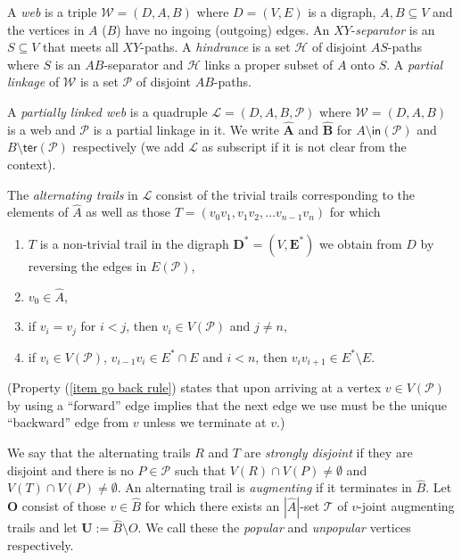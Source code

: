 \documentclass[12pt,a4paper]{amsart}
\theoremstyle{plain}
\theoremstyle{definition}
\begin{document}
 A \emph{web} is a triple $\boldsymbol{ \mathcal{W}}=(D,A,B) $ where $ D=(V,E) $ is a digraph,  $ A,B\subseteq V $ 
 and the vertices in $ A $ ($ B $) have no ingoing (outgoing) edges. 
 An $ XY $-\emph{separator}  is an $ S\subseteq V $ that meets all $ XY $-paths. A \emph{hindrance}  is a set $ 
  \mathcal{H} $ of disjoint $ AS $-paths where $ S 
 $ is an $ AB $-separator and $ \mathcal{H} $ links a proper 
 subset of $ A $ onto $ S $.
 A 
 \emph{partial linkage} of $ \mathcal{W} $ is a set $ \mathcal{P} $ of disjoint  $ AB $-paths. 
 
 A \emph{partially linked 
 web} is a 
 quadruple $ 
 \boldsymbol{\mathcal{L}}=(D,A,B, \mathcal{P}) $ where $\mathcal{W}= (D,A,B) $ is a web and $ \mathcal{P} $ is a 
 partial linkage in it. We write $ 
\boldsymbol{ \widehat{A}} $ and $ \boldsymbol{\widehat{B}} $ for $ A \setminus \mathsf{in}(\mathcal{P}) $ and $ B 
\setminus 
 \mathsf{ter}(\mathcal{P}) $ respectively (we add $ \mathcal{L} $ as subscript if it is not clear from the context).   
 
 The \emph{alternating trails} in $ \mathcal{L} $ consist of the trivial trails corresponding to the elements of $ \widehat{A} 
 $ as well as those
 $T= (v_0v_1, 
 v_1v_2, \dots v_{n-1}v_n) $ for which
 
 
 \begin{enumerate}
 \item\label{item: reversed edges} $ T $ is a non-trivial trail in the digraph $ \boldsymbol{D^{*}}=(V,\boldsymbol{E^{*}}) 
 $ we 
  obtain from $ D $ by reversing 
  the edges in $ E(\mathcal{P})$, 
 \item\label{item: start in A hat}  $ v_0\in \widehat{A} $,
 \item\label{item: repeat vertex} if $ v_i=v_j $ for $ i< j $, then $ v_i\in V(\mathcal{P}) $ and $ j\neq n $,
 \item\label{item go back rule} if $ v_{i}\in V(\mathcal{P}) $,   $v_{i-1}v_{i}\in E^{*}\cap E $ and  $ i<n $, then 
 $ 
 v_{i}v_{i+1}\in E^{*}\setminus E $. 
 \end{enumerate}
(Property (\ref{item go back rule}) states that upon arriving at a vertex $ v\in V(\mathcal{P}) $ by using a ``forward'' edge implies that the 
next edge we use must be the unique ``backward'' edge from $ v $ unless we terminate at $ v $.)
 
We say that the alternating trails $ R $ and $ T $ are \emph{strongly disjoint} if they are disjoint and there is no $ P\in 
\mathcal{P} $ 
such that $ V(R)\cap V(P)\neq \emptyset  $ and $ V(T)\cap V(P)\neq \emptyset  $.  An alternating trail is \emph{augmenting} 
if it terminates in $ \widehat{B} $.    Let $ 
\boldsymbol{O} $ consist 
 of those $ v\in \widehat{B} $ for which there exists an $ 
\left|\widehat{A}\right|$-set  $ \mathcal{T} $ of $ v $-joint augmenting trails and let 
$\boldsymbol{U}:=\widehat{B}\setminus 
O $. We call these the \emph{popular} and \emph{unpopular} vertices respectively. 
 
\end{document}
